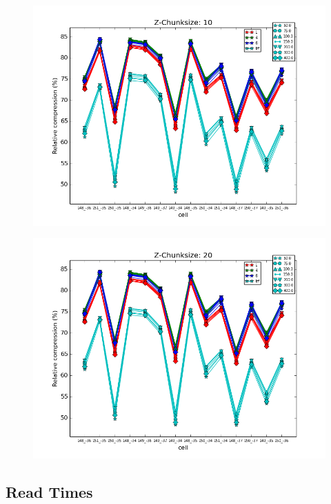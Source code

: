 \documentclass[a4paper]{article}
\begin{document}
      \begin{figure}[h!]
        \centering
        \includegraphics[scale=0.5]{Compression-ratio-per-cell-z_chunk-10.png}
      \end{figure}
    
      \begin{figure}[h!]
        \centering
        \includegraphics[scale=0.5]{Compression-ratio-per-cell-z_chunk-20.png}
      \end{figure}
    
    \newpage

    \subsection{Read Times}
\end{document}

